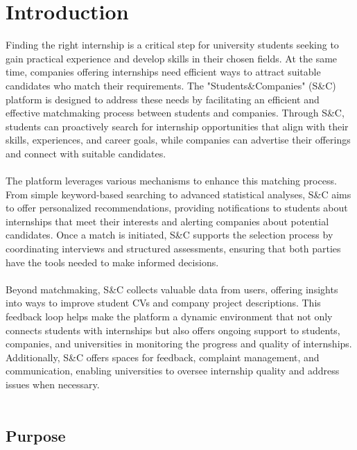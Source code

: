 \section{Introduction}

Finding the right internship is a critical step for university students seeking to gain practical experience and develop skills in their chosen fields. At the same time, companies offering internships need efficient ways to attract suitable candidates who match their requirements. The "Students\&Companies" (S\&C) platform is designed to address these needs by facilitating an efficient and effective matchmaking process between students and companies. Through S\&C, students can proactively search for internship opportunities that align with their skills, experiences, and career goals, while companies can advertise their offerings and connect with suitable candidates.\\ \\
The platform leverages various mechanisms to enhance this matching process. From simple keyword-based searching to advanced statistical analyses, S\&C aims to offer personalized recommendations, providing notifications to students about internships that meet their interests and alerting companies about potential candidates. Once a match is initiated, S\&C supports the selection process by coordinating interviews and structured assessments, ensuring that both parties have the tools needed to make informed decisions.\\ \\
Beyond matchmaking, S\&C collects valuable data from users, offering insights into ways to improve student CVs and company project descriptions. This feedback loop helps make the platform a dynamic environment that not only connects students with internships but also offers ongoing support to students, companies, and universities in monitoring the progress and quality of internships. Additionally, S\&C offers spaces for feedback, complaint management, and communication, enabling universities to oversee internship quality and address issues when necessary.\\ \\


\subsection{Purpose}

